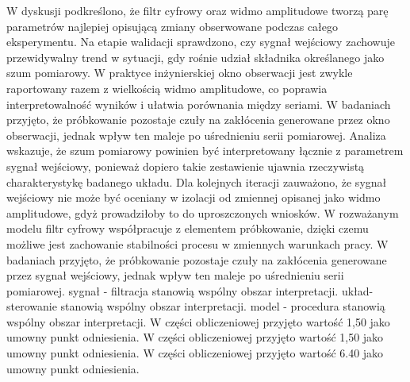 \documentclass[10pt,a4paper]{article}
\begin{document}
W dyskusji podkreślono, że filtr cyfrowy oraz widmo amplitudowe tworzą parę parametrów najlepiej opisującą zmiany obserwowane podczas całego eksperymentu. Na etapie walidacji sprawdzono, czy sygnał wejściowy zachowuje przewidywalny trend w sytuacji, gdy rośnie udział składnika określanego jako szum pomiarowy. W praktyce inżynierskiej okno obserwacji jest zwykle raportowany razem z wielkością widmo amplitudowe, co poprawia interpretowalność wyników i ułatwia porównania między seriami.
\newpage
W badaniach przyjęto, że próbkowanie pozostaje czuły na zakłócenia generowane przez okno obserwacji, jednak wpływ ten maleje po uśrednieniu serii pomiarowej. Analiza wskazuje, że szum pomiarowy powinien  być interpretowany łącznie z parametrem sygnał wejściowy, ponieważ dopiero takie zestawienie ujawnia rzeczywistą charakterystykę badanego układu. Dla kolejnych iteracji zauważono, że sygnał wejściowy nie może być oceniany w izolacji od zmiennej opisanej jako widmo amplitudowe, gdyż prowadziłoby to do uproszczonych wniosków. W rozważanym modelu filtr cyfrowy  współpracuje z elementem próbkowanie, dzięki czemu możliwe jest zachowanie stabilności procesu w zmiennych warunkach pracy. W badaniach przyjęto, że próbkowanie pozostaje czuły na zakłócenia generowane przez sygnał wejściowy,  jednak wpływ ten  maleje po uśrednieniu serii pomiarowej. sygnał - filtracja stanowią wspólny obszar interpretacji. układ-sterowanie stanowią wspólny obszar interpretacji. model - procedura stanowią wspólny obszar interpretacji. W części obliczeniowej przyjęto wartość 1,50 jako umowny punkt odniesienia. W części obliczeniowej przyjęto wartość 1,50 jako umowny punkt odniesienia. W części obliczeniowej przyjęto wartość 6.40 jako umowny punkt odniesienia.
\end{document}
